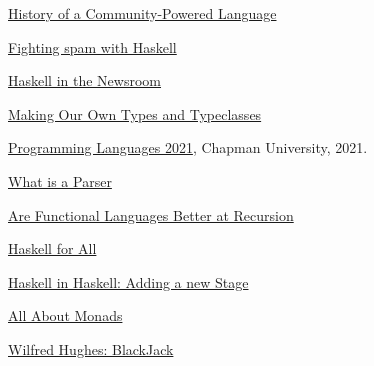 \documentclass{article}
\begin{document}
\begin{thebibliography}{99}

\href{https://serokell.io/blog/haskell-history}{History of a Community-Powered Language}

\href{https://engineering.fb.com/2015/06/26/security/fighting-spam-with-haskell/}{Fighting spam with Haskell}

{\href{https://www.infoq.com/presentations/haskell-newsroom-nyt/}{Haskell in the Newsroom}}

\href{http://learnyouahaskell.com/making-our-own-types-and-typeclasses}{Making Our Own Types and Typeclasses}

\href{https://github.com/alexhkurz/programming-languages-2021/blob/main/README.md}{Programming Languages 2021}, Chapman University, 2021.

\href{https://www.techopedia.com/definition/3854/parser}{What is a Parser}

\href{https://softwareengineering.stackexchange.com/questions/149167/are-functional-languages-better-at-recursion}{Are Functional Languages Better at Recursion}

\href{https://www.haskellforall.com/2012/10/parsing-chemical-substructures.html}{Haskell for All}

\href{https://cronokirby.com/posts/2020/12/haskell-in-haskell-3/}{Haskell in Haskell: Adding a new Stage}

\href{https://wiki.haskell.org/All_About_Monads}{All About Monads}

\href{https://github.com/Wilfred/Blackjack/blob/master/Blackjack.hs}{
Wilfred Hughes: BlackJack}

\end{thebibliography}
\end{document}
